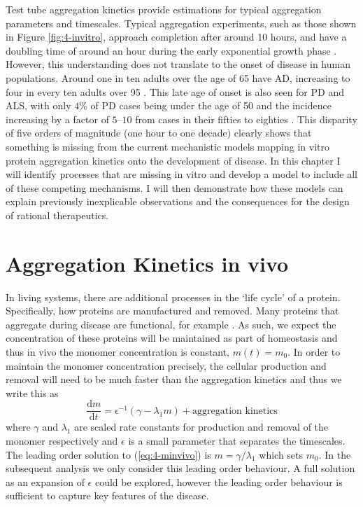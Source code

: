 Test tube aggregation kinetics provide estimations for typical aggregation parameters and timescales. Typical aggregation experiments, such as those shown in Figure \ref{fig:4-invitro}, approach completion after around 10 hours, and have a doubling time of around an hour during the early exponential growth phase \cite{meisl_mechanistic_2022}. However, this understanding does not translate to the onset of disease in human populations. Around one in ten adults over the age of 65 have AD, increasing to four in every ten adults over 95 \cite{hou_ageing_2019}. This late age of onset is also seen for PD and ALS, with only $4\%$ of PD cases being under the age of 50 and the incidence increasing by a factor of $5$–$10$ from cases in their fifties to eighties \cite{van_den_eeden_incidence_2003, poewe_parkinson_2017}. This disparity of five orders of magnitude (one hour to one decade) clearly shows that something is missing from the current mechanistic models mapping in vitro protein aggregation kinetics onto the development of disease. In this chapter I will identify processes that are missing in vitro and develop a model to include all of these competing mechanisms. I will then demonstrate how these models can explain previously inexplicable observations and the consequences for the design of rational therapeutics.

\section{Aggregation Kinetics in vivo}

In living systems, there are additional processes in the `life cycle' of a protein. Specifically, how proteins are manufactured and removed. Many proteins that aggregate during disease are functional, for example . As such, we expect the concentration of these proteins will be maintained as part of homeostasis and thus in vivo the monomer concentration is constant, $m(t)=m_0$. In order to maintain the monomer concentration precisely, the cellular production and removal will need to be much faster than the aggregation kinetics and thus we write this as
\begin{equation}
    \frac{\text{d}m}{\text{d}t} = \epsilon^{-1}\left( \gamma - \lambda_1 m \right) + \text{aggregation kinetics}
    \label{eq:4-minvivo}
\end{equation}
where $\gamma$ and $\lambda_1$ are scaled rate constants for production and removal of the monomer respectively and $\epsilon$ is a small parameter that separates the timescales. The leading order solution to (\ref{eq:4-minvivo}) is $m=\gamma/\lambda_1$ which sets $m_0$. In the subsequent analysis we only consider this leading order behaviour. A full solution as an expansion of $\epsilon$ could be explored, however the leading order behaviour is sufficient to capture key features of the disease.

